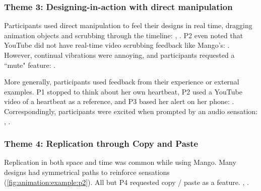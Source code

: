 \subsubsection{Theme 3: Designing-in-action with direct manipulation}
Participants used direct manipulation to feel their designs in real time, %
dragging animation objects %
and scrubbing through
the timeline: ,
.
P2 even noted that YouTube did not have
 real-time video scrubbing feedback like Mango's:
 .
However, continual %
vibrations were annoying, and participants requested a ``mute" feature:
.

More generally, participants used feedback from their experience or external examples.
P1 stopped to think about her own heartbeat,  P2 used a YouTube video of a heartbeat as a reference, and P3 based her alert on her phone: %
.
Correspondingly, participants were excited when prompted by an audio sensation: ,
.



\subsubsection{Theme 4: Replication through Copy and Paste}
Replication in both space and time was common while using Mango.
Many designs had symmetrical paths to reinforce sensations (\autoref{fig:animation:example:p2}).
All but P4 requested copy / paste as a feature.
, .

